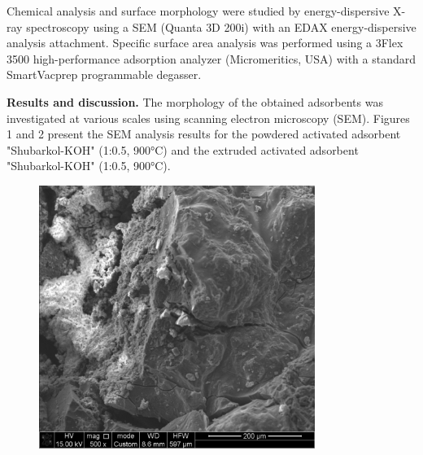 Chemical analysis and surface morphology were studied by
energy-dispersive X-ray spectroscopy using a SEM (Quanta 3D 200i) with
an EDAX energy-dispersive analysis attachment. Specific surface area
analysis was performed using a 3Flex 3500 high-performance adsorption
analyzer (Micromeritics, USA) with a standard SmartVacprep programmable
degasser.

{\bfseries Results and discussion.} The morphology of the obtained
adsorbents was investigated at various scales using scanning electron
microscopy (SEM). Figures 1 and 2 present the SEM analysis results for
the powdered activated adsorbent "Shubarkol-KOH" (1:0.5, 900°C) and the
extruded activated adsorbent "Shubarkol-KOH" (1:0.5, 900°C).

\begin{figure}[H]
	\centering
	\includegraphics[width=0.8\textwidth]{media/chem2/image9}
	\caption*{}
\end{figure}

